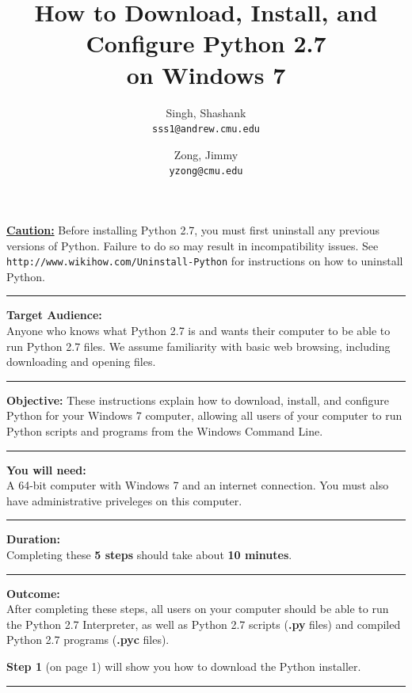 \documentclass[11pt,english]{article}
\title{How to Download, Install, and Configure Python 2.7\\ on Windows 7}
\author{
  Singh, Shashank \\
  \texttt{sss1@andrew.cmu.edu}
  \and
  Zong, Jimmy\\
  \texttt{yzong@cmu.edu}
}
\newcommand{\myhrule}{\vspace{0.3cm}\hrule\vspace{0.3cm}}
\begin{document}
\begin{titlepage}
\maketitle
\vfill
{\bf \color{red} \underline{Caution:}} Before installing Python 2.7, you must
first uninstall any previous versions of Python. Failure to do so may result in
incompatibility issues. See \texttt{http://www.wikihow.com/Uninstall-Python}
for instructions on how to uninstall Python.
\myhrule
{\bf Target Audience:}\\
Anyone who knows what Python 2.7 is and wants their computer to be able to run
Python 2.7 files. We assume familiarity with basic web browsing, including
downloading and opening files.
\myhrule
{\bf Objective:} These instructions explain how to download, install, and
configure Python for your Windows 7 computer, allowing all users of your
computer to run Python scripts and programs from the Windows Command Line.
\myhrule
{\bf You will need:}\\
A 64-bit computer with Windows 7 and an internet connection. You must also have
administrative priveleges on this computer.
\myhrule
{\bf Duration:}\\
Completing these {\bf 5 steps} should take about {\bf 10 minutes}.
\myhrule
{\bf Outcome:}\\
After completing these steps, all users on your computer should be able to run
the Python 2.7 Interpreter, as well as Python 2.7 scripts ({\bf .py} files) and
compiled Python 2.7 programs ({\bf .pyc} files).
\vspace{3cm}

{\bf Step 1} (on page 1) will show you how to download the Python
installer.
\myhrule
\end{titlepage}
\end{document}
